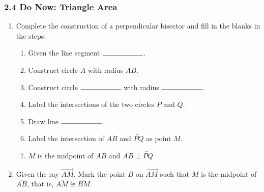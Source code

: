 \documentclass[12pt, twoside]{article}
\begin{document}
  \subsubsection*{2.4 Do Now: Triangle Area}

    \begin{enumerate}
      \item Complete the construction of a perpendicular bisector and fill in the blanks in the steps.
      \begin{enumerate}
        \item Given the line segment $\rule{2cm}{0.15mm}$.
        \item Construct circle $A$ with radius $AB$.
        \bigskip
        \item Construct circle $\rule{2cm}{0.15mm}$  with radius $\rule{2cm}{0.15mm}$. 
        \item Label the intersections of the two circles $P$ and $Q$. \bigskip
        \item Draw line $\rule{2cm}{0.15mm}$.
        \item Label the intersection of $\overline{AB}$ and $\overleftrightarrow{PQ}$ as point $M$.
        \item $M$ is the midpoint of $\overline{AB}$ and $\overline{AB} \perp \overleftrightarrow{PQ}$
      \end{enumerate}
      \vspace{7cm}
      \begin{center}
      \end{center}

\newpage

\item Given the ray $\overrightarrow{AM}$. Mark the point $B$ on $\overrightarrow{AM}$ such that $M$ is the midpoint of $\overline{AB}$,  that is, $\overline{AM} \cong \overline{BM}$.\\[0.75cm]
\vspace{1cm}


\end{enumerate}
\end{document}
